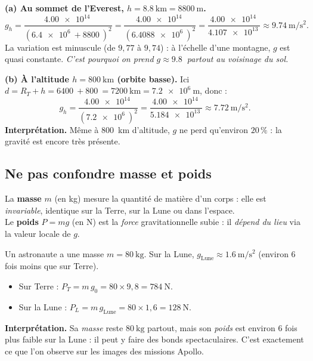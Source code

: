 \documentclass[11pt,a4paper]{article}
\begin{document}
\begin{exemple}
\textbf{(a) Au sommet de l'Everest, $h=\SI{8.8}{\kilo\metre}=\SI{8800}{\metre}$.}
\[
g_h=\frac{\SI{4.00e14}{}}{(\SI{6.4e6}{}+\SI{8800}{})^2}
   =\frac{\SI{4.00e14}{}}{(\SI{6.4088e6}{})^2}
   =\frac{\SI{4.00e14}{}}{\SI{4.107e13}{}}\approx\SI{9.74}{\metre\per\second\squared}.
\]
La variation est minuscule (de $9{,}77$ à $9{,}74$) : à l'échelle d'une montagne,
$g$ est quasi constante. \emph{C'est pourquoi on prend $g\approx\SI{9.8}{}$ partout
au voisinage du sol.}

\smallskip
\textbf{(b) À l'altitude $h=\SI{800}{\kilo\metre}$ (orbite basse).} Ici $d=R_T+h=
\SI{6400}{}+\SI{800}{}=\SI{7200}{\kilo\metre}=\SI{7.2e6}{\metre}$, donc :
\[
g_h=\frac{\SI{4.00e14}{}}{(\SI{7.2e6}{})^2}
   =\frac{\SI{4.00e14}{}}{\SI{5.184e13}{}}\approx\SI{7.72}{\metre\per\second\squared}.
\]
\textbf{Interprétation.} Même à \SI{800}{\kilo\metre} d'altitude, $g$ ne perd qu'environ
$20\,\%$ : la gravité est encore très présente.
\end{exemple}

\subsection{Ne pas confondre masse et poids}

\begin{definition}
La \textbf{masse} $m$ (en \si{\kilogram}) mesure la quantité de matière d'un corps : elle
est \emph{invariable}, identique sur la Terre, sur la Lune ou dans l'espace. \\
Le \textbf{poids} $P=mg$ (en \si{\newton}) est la \emph{force} gravitationnelle subie : il
\emph{dépend du lieu} via la valeur locale de $g$.
\end{definition}

\begin{exemple}
Un astronaute a une masse $m=\SI{80}{\kilogram}$. Sur la Lune,
$g_{\text{Lune}}\approx\SI{1.6}{\metre\per\second\squared}$ (environ $6$ fois moins que
sur Terre).
\begin{itemize}[leftmargin=1.6em,topsep=2pt,itemsep=1pt]
  \item Sur Terre : $P_T=m\,g_0=80\times 9{,}8=\SI{784}{\newton}$.
  \item Sur la Lune : $P_L=m\,g_{\text{Lune}}=80\times 1{,}6=\SI{128}{\newton}$.
\end{itemize}
\textbf{Interprétation.} Sa \emph{masse} reste $\SI{80}{\kilogram}$ partout, mais son
\emph{poids} est environ $6$ fois plus faible sur la Lune : il peut y faire des bonds
spectaculaires. C'est exactement ce que l'on observe sur les images des missions Apollo.
\end{exemple}
\end{document}
